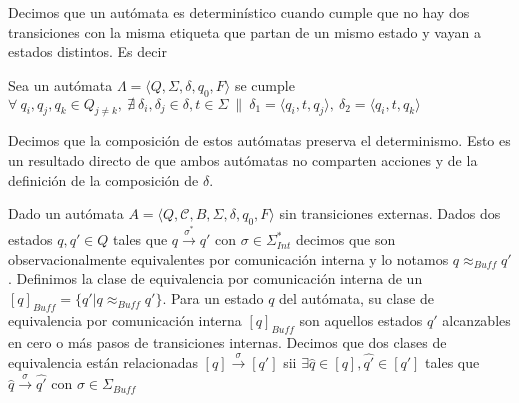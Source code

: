 \begin{definition}[Determinismo] Decimos que un autómata es determinístico cuando cumple que no hay dos transiciones con la misma etiqueta que partan de un mismo estado y vayan a estados distintos. Es decir 

\begin{centering}
Sea un autómata $ \Lambda = \langle Q, \Sigma, \delta, q_0, F \rangle$ se cumple
$ \forall \  q_i, q_j, q_k \in Q_{j \neq k}, \  \nexists \ \delta_i, \delta_j \in \delta, t \in \Sigma \ \| \  \delta_1 = \langle q_i, t, q_j \rangle, \ \delta_2 = \langle q_i, t, q_k \rangle$ \\
\end{centering} 

Decimos que la composición de estos autómatas preserva el determinismo. Esto es un resultado directo de que ambos autómatas no comparten acciones y de la definición de la composición de $\delta$.
\end{definition}

\begin{definition}
Dado un autómata $A = \langle Q, \mathcal{C}, B, \Sigma, \delta, q_0, F \rangle$ sin transiciones externas. Dados dos estados $q, q' \in Q$ tales que $q \xrightarrow{\sigma^*} q'$ con $\sigma \in \Sigma_{\mathit{Int}}^*$ decimos que son observacionalmente equivalentes por comunicación interna y lo notamos $q \approx_{Buff} q'$. Definimos la clase de equivalencia por comunicación interna de un $[q]_{Buff}= \{q'| q \approx_{Buff} q'\}$. Para un estado $q$ del autómata, su clase de equivalencia por comunicación interna $[q]_{Buff}$ son aquellos estados $q'$ alcanzables en cero o más pasos de transiciones internas. Decimos que dos clases de equivalencia están relacionadas $[q] \xrightarrow{\sigma} [q']$ sii $\exists \hat{q} \in [q], \hat{q'} \in [q']$ tales que $\hat{q} \xrightarrow{\sigma} \hat{q'}$ con $\sigma \in \Sigma_{Buff}$\end{definition}


